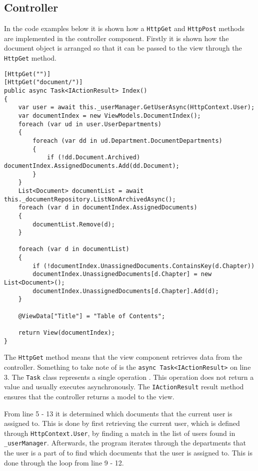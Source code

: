 \subsection{Controller}

In the code examples below it is shown how a \texttt{HttpGet} and \texttt{HttpPost} methods are implemented in the controller component.
Firstly it is shown how the document object is arranged so that it can be passed to the view through the \texttt{HttpGet} method.
\\

\begin{lstlisting}[caption={Document Controller: Index}, label={lst:doccontroller}]
[HttpGet("")]
[HttpGet("document/")]
public async Task<IActionResult> Index()
{
	var user = await this._userManager.GetUserAsync(HttpContext.User);
	var documentIndex = new ViewModels.DocumentIndex();
	foreach (var ud in user.UserDepartments)
	{
		foreach (var dd in ud.Department.DocumentDepartments)
		{
			if (!dd.Document.Archived) documentIndex.AssignedDocuments.Add(dd.Document);
		}
	}
	List<Document> documentList = await this._documentRepository.ListNonArchivedAsync();
	foreach (var d in documentIndex.AssignedDocuments)
	{
		documentList.Remove(d);
	}

	foreach (var d in documentList)
	{
		if (!documentIndex.UnassignedDocuments.ContainsKey(d.Chapter))
		documentIndex.UnassignedDocuments[d.Chapter] = new List<Document>();
		documentIndex.UnassignedDocuments[d.Chapter].Add(d);
	}

	@ViewData["Title"] = "Table of Contents";

	return View(documentIndex);
}
\end{lstlisting}

The \texttt{HttpGet} method means that the view component retrieves data from the controller.
Something to take note of is the \texttt{async Task<IActionResult>} on line 3.
The \texttt{Task} class represents a single operation \cite{microsoft}.
This operation does not return a value and usually executes asynchronously.
The \texttt{IActionResult} result method ensures that the controller returns a model to the view.

From line 5 - 13 it is determined which documents that the current user is assigned to.
This is done by first retrieving the current user, which is defined through \texttt{HttpContext.User}, by finding a match in the list of users found in \texttt{_userManager}.
Afterwards, the program iterates through the departments that the user is a part of to find which documents that the user is assigned to.
This is done through the loop from line 9 - 12.

